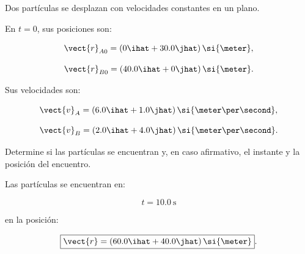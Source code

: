 \begin{ejercicio}
Dos partículas se desplazan con velocidades
constantes en un plano.

En \(t=0\), sus posiciones son:

\[
\vect{r}_{A0}
=
(0\ihat+30.0\jhat)\,\si{\meter},
\]

\[
\vect{r}_{B0}
=
(40.0\ihat+0\jhat)\,\si{\meter}.
\]

Sus velocidades son:

\[
\vect{v}_A
=
(6.0\ihat+1.0\jhat)\,
\si{\meter\per\second},
\]

\[
\vect{v}_B
=
(2.0\ihat+4.0\jhat)\,
\si{\meter\per\second}.
\]

Determine si las partículas se encuentran
y, en caso afirmativo, el instante
y la posición del encuentro.
\end{ejercicio}

\begin{respuesta}
Las partículas se encuentran en:

\[
\boxed{
t=\SI{10.0}{\second}
}
\]

en la posición:

\[
\boxed{
\vect{r}
=
(60.0\ihat+40.0\jhat)\,\si{\meter}
}.
\]
\end{respuesta}

